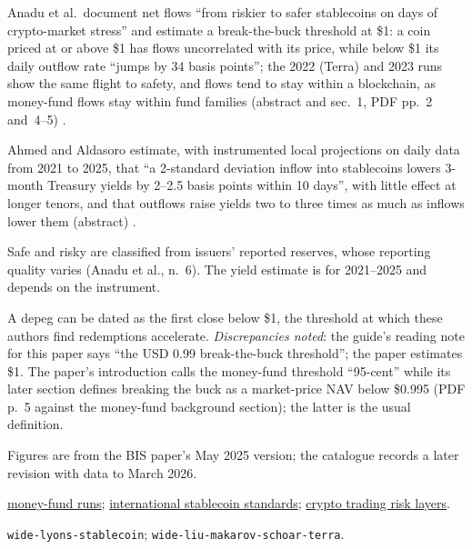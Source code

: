 \begin{qfevidence}\label{ev:stablecoin-runs}
 Anadu et al.\ document net flows ``from riskier to safer stablecoins on days of crypto-market stress'' and estimate a break-the-buck threshold at \$1: a coin priced at or above \$1 has flows uncorrelated with its price, while below \$1 its daily outflow rate ``jumps by 34 basis points''; the 2022 (Terra) and 2023 runs show the same flight to safety, and flows tend to stay within a blockchain, as money-fund flows stay within fund families (abstract and sec.~1, PDF pp.~2 and~4--5) \citep[Staff Report~1073, September 2023, revised April 2024, abstract and sec.~1]{cd-anadu-2023}.

Ahmed and Aldasoro estimate, with instrumented local projections on daily data from 2021 to 2025, that ``a 2-standard deviation inflow into stablecoins lowers 3-month Treasury yields by 2--2.5 basis points within 10 days'', with little effect at longer tenors, and that outflows raise yields two to three times as much as inflows lower them (abstract) \citep[BIS WP~1270, May 2025 version, abstract]{rt-ahmed-aldasoro-stablecoins}.

 Safe and risky are classified from issuers' reported reserves, whose reporting quality varies (Anadu et al., n.~6). The yield estimate is for 2021--2025 and depends on the instrument.

 A depeg can be dated as the first close below \$1, the threshold at which these authors find redemptions accelerate. \emph{Discrepancies noted}: the guide's reading note for this paper says ``the USD 0.99 break-the-buck threshold''; the paper estimates \$1. The paper's introduction calls the money-fund threshold ``95-cent'' while its later section defines breaking the buck as a market-price NAV below \$0.995 (PDF p.~5 against the money-fund background section); the latter is the usual definition.

 Figures are from the BIS paper's May 2025 version; the catalogue records a later revision with data to March 2026.

 \hyperref[ev:money-fund-runs]{money-fund runs}; \hyperref[rule:stablecoin-standards]{international stablecoin standards}; \hyperref[def:crypto-trading-risk-layers]{crypto trading risk layers}.

 \nolinkurl{wide-lyons-stablecoin}; \nolinkurl{wide-liu-makarov-schoar-terra}.

\end{qfevidence}

